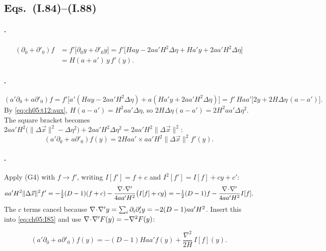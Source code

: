 \subsection[Eqs. (I.84)--(I.88)]{Eqs.~(I.84)--(I.88) \tD}

\paragraph{.}
\begin{equation}
\begin{aligned}
(\partial_0+\partial'_0)f&=f'\big[\partial_0y+\partial'_0y\big]=f'\big[Hay-2aa'H^2\Delta\eta+Ha'y+2aa'H^2\Delta\eta\big]\\
&=H(a+a')\,y\,f'(y).
\end{aligned}
\tag{I.84}\label{eq:ch05:I84}
\end{equation}

\paragraph{.}
\begin{equation*}
(a'\partial_0+a\partial'_0)f=f'\big[a'(Hay-2aa'H^2\Delta\eta)+a(Ha'y+2aa'H^2\Delta\eta)\big]=f'\,Haa'\big[2y+2H\Delta\eta\,(a-a')\big].
\end{equation*}
By \eqref{eq:ch05:t12:aux}, $H(a-a')=H^2aa'\Delta\eta$, so $2H\Delta\eta(a-a')=2H^2aa'\Delta\eta^2$.
The square bracket becomes $2aa'H^2\big(\|\Delta\vec x\|^2-\Delta\eta^2\big)+2aa'H^2\Delta\eta^2=2aa'H^2\|\Delta\vec x\|^2$:
\begin{equation}
(a'\partial_0+a\partial'_0)f(y)=2Haa'\times aa'H^2\|\Delta\vec x\|^2f'(y).
\tag{I.85}\label{eq:ch05:I85}
\end{equation}

\paragraph{.}
Apply (G4) with $f\to f'$, writing $I[f']=f+c$ and $I^2[f']=I[f]+cy+c'$:
\begin{equation*}
aa'H^2\|\Delta\vec x\|^2f'=-\tfrac12(D-1)(f+c)-\frac{\nabla\!\cdot\!\nabla'}{4aa'H^2}\big(I[f]+cy\big)=-\tfrac12(D-1)f-\frac{\nabla\!\cdot\!\nabla'}{4aa'H^2}I[f].
\end{equation*}
The $c$ terms cancel because $\nabla\!\cdot\!\nabla' y=\sum_i\partial_i\partial'_iy=-2(D-1)aa'H^2$.
Insert this into \eqref{eq:ch05:I85} and use $\nabla\!\cdot\!\nabla' F(y)=-\nabla^2F(y)$:
\begin{resultbox}
\begin{equation}
(a'\partial_0+a\partial'_0)f(y)=-(D-1)Haa'f(y)+\frac{\nabla^2}{2H}\,I[f](y).
\tag{I.86}\label{eq:ch05:I86}
\end{equation}
\end{resultbox}

